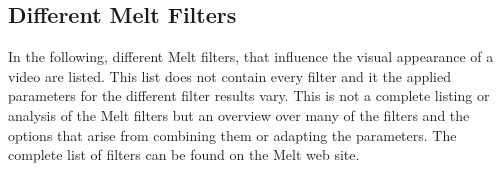 \documentclass[../MasterThesis.tex]{subfiles}
\begin{document}

\newpage
\subsection{Different Melt Filters} \label{appendix:differentMeltFilter}

In the following, different Melt filters, that influence the visual appearance of a video are listed. This list does not contain every filter and it the applied parameters for the different filter results vary. This is not a complete listing or analysis of the Melt filters but an overview over many of the filters and the options that arise from combining them or adapting the parameters. The complete list of filters can be found on the Melt web site.~\cite{melt_filters} 




	
	
\end{document}
